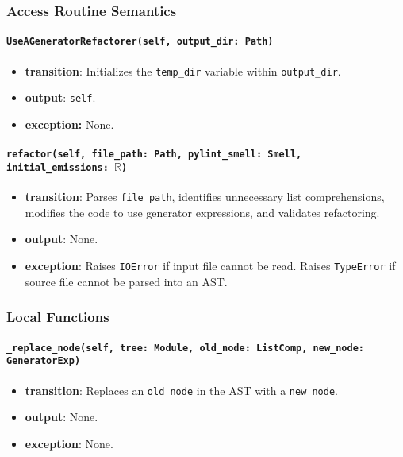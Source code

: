 \documentclass[12pt, titlepage]{article}
\begin{document}
\subsubsection{Access Routine Semantics}

\paragraph{\texttt{UseAGeneratorRefactorer(self, output\_dir: Path)}}
\begin{itemize}
  \item \textbf{transition}: Initializes the \texttt{temp\_dir} variable within \texttt{output\_dir}.
  \item \textbf{output}: \texttt{self}.
  \item \textbf{exception:} None.
\end{itemize}

\paragraph{\texttt{refactor(self, file\_path: Path, pylint\_smell: Smell, initial\_emissions: $\mathbb{R}$)}}
\begin{itemize}
  \item \textbf{transition}: Parses \texttt{file\_path}, identifies unnecessary list comprehensions, modifies the code to use generator expressions, and validates refactoring.
  \item \textbf{output}: None.
  \item \textbf{exception}: Raises \texttt{IOError} if input file cannot be read. Raises \texttt{TypeError} if source file cannot be parsed into an AST.
\end{itemize}

\subsubsection{Local Functions}
\paragraph{\texttt{\_replace\_node(self, tree: Module, old\_node: ListComp, new\_node: GeneratorExp)}}
\begin{itemize}
  \item \textbf{transition}: Replaces an \texttt{old\_node} in the AST with a \texttt{new\_node}.
  \item \textbf{output}: None.
  \item \textbf{exception}: None.
\end{itemize}
\end{document}

